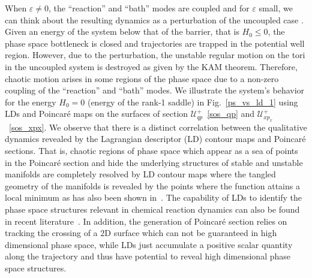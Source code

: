 \documentclass{ws-ijbc}
\begin{document}
When $\varepsilon \neq 0$, the ``reaction'' and ``bath'' modes are coupled and for $\varepsilon$ small, we can think about the resulting dynamics as a perturbation of the uncoupled case . Given an energy of the system below that of the barrier, that is $H_0 \leq 0$, the phase space bottleneck is closed and trajectories are trapped in the potential well region. However, due to the perturbation, the unstable regular motion on the tori in the uncoupled system is destroyed as given by the KAM theorem. Therefore, chaotic motion arises in some regions of the phase space due to a non-zero coupling of the ``reaction'' and ``bath'' modes. We illustrate the system's behavior for the energy $H_0 = 0$ (energy of the rank-1 saddle) in Fig.~\ref{ps_vs_ld_1} using LDs and Poincar\'e maps on the surfaces of section $\mathcal{U}^{+}_{qp}$~\eqref{sos_qp} and $\mathcal{U}^{+}_{xp_x}$~\eqref{sos_xpx}. We observe that there is a distinct correlation between the qualitative dynamics revealed by the Lagrangian descriptor (LD) contour maps and Poincar\'e sections. That is, chaotic regions of phase space which appear as a sea of points in the Poincar\'e section and hide the underlying structures of stable and unstable manifolds are completely resolved by LD contour maps where the tangled geometry of the manifolds is revealed by the points where the function attains a local minimum as has also been shown in~\cite{Naik2019b}. The capability of LDs to identify the phase space structures relevant in chemical reaction dynamics can also be found in recent literature~\cite{craven2016deconstructing,demian2017,Naik2019a}. In addition, the generation of Poincar\'e section relies on tracking the crossing of a 2D surface which can not be guaranteed in high dimensional phase space, while LDs just accumulate a positive scalar quantity along the trajectory and thus have potential to reveal high dimensional phase space structures.
\end{document}
